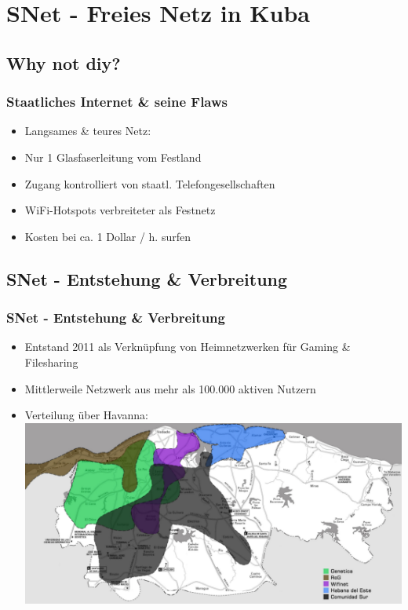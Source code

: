 \section{SNet - Freies Netz in Kuba}
\subsection{Why not diy?}

\begin{frame}
\frametitle{Staatliches Internet \& seine Flaws}
	\begin{itemize}
		\item Langsames \& teures Netz:
		\item Nur 1 Glasfaserleitung vom Festland
		\item Zugang kontrolliert von staatl. Telefongesellschaften
		\item WiFi-Hotspots verbreiteter als Festnetz
		\item Kosten bei ca. 1 Dollar / h. surfen
	\end{itemize}
\end{frame}

\subsection{SNet - Entstehung \& Verbreitung}

\begin{frame}
\frametitle{SNet - Entstehung \& Verbreitung}
	\begin{itemize}
		\item Entstand 2011 als Verknüpfung von Heimnetzwerken für Gaming \& Filesharing
		\item Mittlerweile Netzwerk aus mehr als 100.000 aktiven Nutzern
		\item Verteilung über Havanna:
			\includegraphics[width=\textwidth]{images/havanna_net.jpg}
	\end{itemize}
	
\end{frame}

